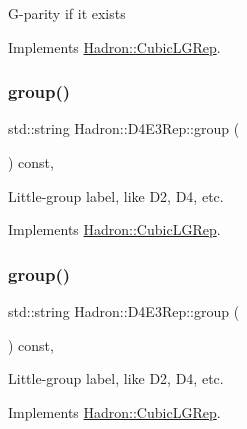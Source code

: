 G-\/parity if it exists 

Implements \mbox{\hyperlink{structHadron_1_1CubicLGRep_ace26f7b2d55e3a668a14cb9026da5231}{Hadron\+::\+Cubic\+L\+G\+Rep}}.

\mbox{\label{structHadron_1_1D4E3Rep_a5bae515c0b50b8f5e96c3d42b8f32f4d}} 
\subsubsection{\texorpdfstring{group()}{group()}\hspace{0.1cm}{\footnotesize\ttfamily [1/5]}}
{\footnotesize\ttfamily std\+::string Hadron\+::\+D4\+E3\+Rep\+::group (\begin{DoxyParamCaption}{ }\end{DoxyParamCaption}) const\hspace{0.3cm}{\ttfamily [inline]}, {\ttfamily [virtual]}}

Little-\/group label, like D2, D4, etc. 

Implements \mbox{\hyperlink{structHadron_1_1CubicLGRep_a9bdb14b519a611d21379ed96a3a9eb41}{Hadron\+::\+Cubic\+L\+G\+Rep}}.

\mbox{\label{structHadron_1_1D4E3Rep_a5bae515c0b50b8f5e96c3d42b8f32f4d}} 
\subsubsection{\texorpdfstring{group()}{group()}\hspace{0.1cm}{\footnotesize\ttfamily [2/5]}}
{\footnotesize\ttfamily std\+::string Hadron\+::\+D4\+E3\+Rep\+::group (\begin{DoxyParamCaption}{ }\end{DoxyParamCaption}) const\hspace{0.3cm}{\ttfamily [inline]}, {\ttfamily [virtual]}}

Little-\/group label, like D2, D4, etc. 

Implements \mbox{\hyperlink{structHadron_1_1CubicLGRep_a9bdb14b519a611d21379ed96a3a9eb41}{Hadron\+::\+Cubic\+L\+G\+Rep}}.

\mbox{\label{structHadron_1_1D4E3Rep_a5bae515c0b50b8f5e96c3d42b8f32f4d}} 
